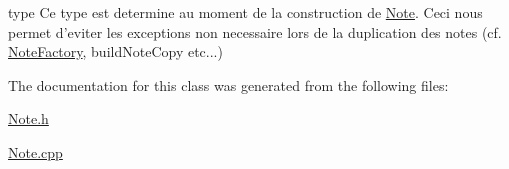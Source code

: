 type Ce type est determine au moment de la construction de \hyperlink{class_note}{Note}. Ceci nous permet d'eviter les exceptions non necessaire lors de la duplication des notes (cf. \hyperlink{class_note_factory}{Note\-Factory}, build\-Note\-Copy etc...) 



The documentation for this class was generated from the following files\-:\begin{DoxyCompactItemize}
\item 
\hyperlink{_note_8h}{Note.\-h}\item 
\hyperlink{_note_8cpp}{Note.\-cpp}\end{DoxyCompactItemize}

